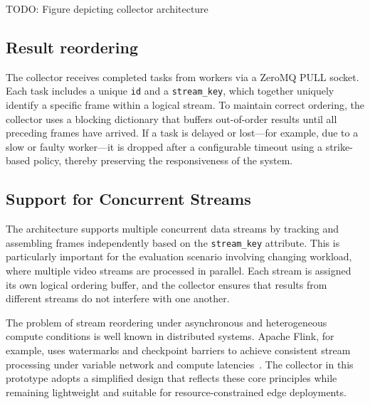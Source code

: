 TODO: Figure depicting collector architecture

\subsection{Result reordering}
The collector receives completed tasks from workers via a ZeroMQ PULL socket. Each task includes a unique \texttt{id} and a \texttt{stream\_key}, which together uniquely identify a specific frame within a logical stream. To maintain correct ordering, the collector uses a blocking dictionary that buffers out-of-order results until all preceding frames have arrived. If a task is delayed or lost—for example, due to a slow or faulty worker—it is dropped after a configurable timeout using a strike-based policy, thereby preserving the responsiveness of the system.

\subsection{Support for Concurrent Streams}
The architecture supports multiple concurrent data streams by tracking and assembling frames independently based on the \texttt{stream\_key} attribute. This is particularly important for the evaluation scenario involving changing workload, where multiple video streams are processed in parallel. Each stream is assigned its own logical ordering buffer, and the collector ensures that results from different streams do not interfere with one another.

The problem of stream reordering under asynchronous and heterogeneous compute conditions is well known in distributed systems. Apache Flink, for example, uses watermarks and checkpoint barriers to achieve consistent stream processing under variable network and compute latencies~\cite{carbone_apache_2015}. The collector in this prototype adopts a simplified design that reflects these core principles while remaining lightweight and suitable for resource-constrained edge deployments.